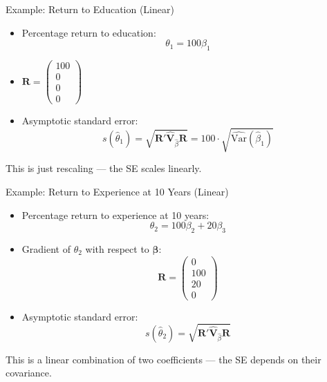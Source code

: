 \documentclass[aspectratio=169, handout, t]{beamer}
\numberwithin{equation}{section}
\begin{document}

\begin{frame}{Example: Return to Education (Linear)}
\begin{itemize}
\item Percentage return to education:
$$\theta_1=100\beta_1$$
\item $\bm{R}=\begin{pmatrix}100\\ 0\\ 0\\ 0\end{pmatrix}$
\item Asymptotic standard error:
\[
s(\hat{\theta}_1) = \sqrt{\bm{R}' \bm{\hat{V}}_{\hat{\beta}} \bm{R}} = 100 \cdot \sqrt{\hat{\text{Var}}(\hat{\beta}_1)}
\]
\end{itemize}

This is just rescaling --- the SE scales linearly.

\end{frame}


\begin{frame}{Example: Return to Experience at 10 Years (Linear)}
\begin{itemize}
\item Percentage return to experience at 10 years:
\[
\theta_2 = 100\beta_2 + 20\beta_3
\]
\item Gradient of $\theta_2$ with respect to $\bm{\beta}$:
\[
\bm{R} =
\begin{pmatrix}
0 \\
100 \\
20 \\
0
\end{pmatrix}
\]
\item Asymptotic standard error:
\[
s(\hat{\theta}_2) = \sqrt{\bm{R}' \bm{\hat{V}}_{\hat{\beta}} \bm{R}}
\]
\end{itemize}

This is a linear combination of two coefficients --- the SE depends on their covariance.

\end{frame}

\end{document}
